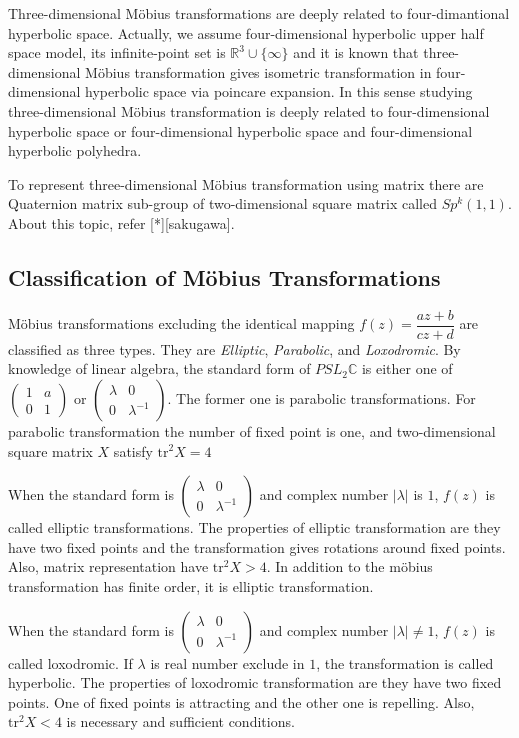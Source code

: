 Three-dimensional M\"obius transformations are deeply related to
four-dimantional hyperbolic space. Actually, we assume four-dimensional
hyperbolic upper half space model, its infinite-point set is
$\mathbb{R}^3\cup\{\infty\}$ and it is known that three-dimensional M\"obius
transformation gives isometric transformation in four-dimensional
hyperbolic space via poincare expansion.
In this sense studying three-dimensional M\"obius transformation is
deeply related to four-dimensional hyperbolic space or four-dimensional
hyperbolic space and four-dimensional hyperbolic polyhedra.

To represent three-dimensional M\"obius transformation using matrix
there are Quaternion matrix sub-group of two-dimensional square matrix called
$Sp^k(1,1)$. About this topic, refer [*][sakugawa].

\subsection{Classification of M\"obius Transformations}

M\"obius transformations excluding the identical mapping
$f(z) = \dfrac{az + b}{cz + d}$ are classified as three types.
They are \textit{Elliptic}, \textit{Parabolic}, and \textit{Loxodromic}.
By knowledge of linear algebra, the standard form of $PSL_2\mathbb{C}$
is either one of $\begin{pmatrix}1 & a \\ 0 & 1 \end{pmatrix}$ or
$\begin{pmatrix}\lambda & 0 \\ 0 & \lambda^{-1} \end{pmatrix}$.
The former one is parabolic transformations.
For parabolic transformation the number of fixed point is one, and
two-dimensional square matrix $X$ satisfy $\mathrm{tr}^2X = 4$

When the standard form is
$\begin{pmatrix}\lambda & 0 \\ 0 & \lambda^{-1} \end{pmatrix}$
and complex number $|\lambda|$ is $1$, $f(z)$ is called elliptic
transformations. The properties of elliptic transformation are they have
two fixed points and the transformation gives rotations around fixed
points.
Also, matrix representation have $\mathrm{tr}^2X > 4$.
In addition to the m\"obius transformation has finite order,
it is elliptic transformation.

When the standard form is
$\begin{pmatrix}\lambda & 0 \\ 0 & \lambda^{-1} \end{pmatrix}$
and complex number $|\lambda| \neq 1$, $f(z)$ is called loxodromic.
If $\lambda$ is real number exclude in $1$, the transformation is called
hyperbolic.
The properties of loxodromic transformation are they have two fixed
points. One of fixed points is attracting and the other one is repelling.
Also, $\mathrm{tr}^2X < 4$ is necessary and sufficient conditions.

